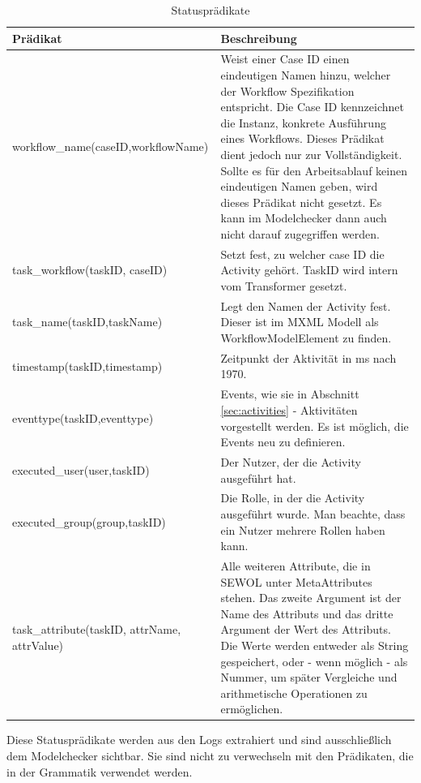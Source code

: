 \begin{table}[h!]
\begin{tabular} {|p{6cm}|p{10cm}|}
\hline
\textbf{Prädikat} & \textbf{Beschreibung}\\
\hline
\small workflow{\_}name(caseID,workflowName)& Weist einer Case ID einen eindeutigen Namen hinzu, welcher der Workflow Spezifikation entspricht. Die Case ID kennzeichnet die Instanz, konkrete Ausführung eines Workflows. Dieses Prädikat dient jedoch nur zur Vollständigkeit. Sollte es für den Arbeitsablauf keinen eindeutigen Namen geben, wird dieses Prädikat nicht gesetzt. Es kann im Modelchecker dann auch nicht darauf zugegriffen werden.\\
\hline
\small task{\_}workflow(taskID, caseID)& Setzt fest, zu welcher case ID die Activity gehört. TaskID wird intern vom Transformer gesetzt.\\
\hline
\small task{\_}name(taskID,taskName)&Legt den Namen der Activity fest. Dieser ist im MXML Modell als WorkflowModelElement zu finden. \\
\hline
\small timestamp(taskID,timestamp)&Zeitpunkt der Aktivität in ms nach 1970. \\
\hline
\small eventtype(taskID,eventtype)& Events, wie sie in Abschnitt \ref{sec:activities} - Aktivitäten vorgestellt werden. Es ist möglich, die Events neu zu definieren.\\
\hline
\small executed{\_}user(user,taskID)&Der Nutzer, der die Activity ausgeführt hat. \\
\hline
\small executed{\_}group(group,taskID)&Die Rolle, in der die Activity ausgeführt wurde. Man beachte, dass ein Nutzer mehrere Rollen haben kann.\\
\hline
\small task{\_}attribute(taskID, attrName, attrValue)& Alle weiteren Attribute, die in SEWOL unter MetaAttributes stehen. Das zweite Argument ist der Name des Attributs und das dritte Argument der Wert des Attributs. Die Werte werden entweder als String gespeichert, oder - wenn möglich - als Nummer, um später Vergleiche und arithmetische Operationen zu ermöglichen. \\

\hline
\end{tabular}
Diese Statusprädikate werden aus den Logs extrahiert und sind ausschließlich dem Modelchecker sichtbar. Sie sind nicht zu verwechseln mit den Prädikaten, die in der Grammatik verwendet werden. 
\caption{Statusprädikate}
\label{tab:statuspr}
\end{table}

